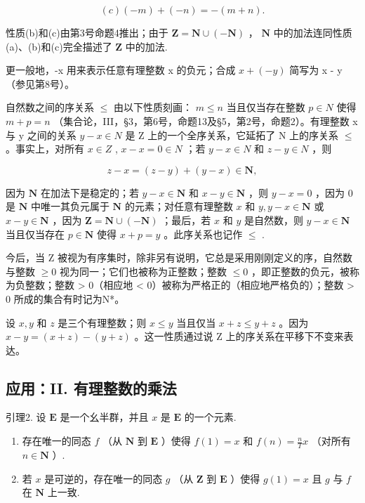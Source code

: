 \[
(c) (- m) + (- n) = - (m + n).
\]

性质(b)和(c)由第3号命题4推出；由于 \(\mathbf{Z} = \mathbf{N} \cup (-\mathbf{N})\) ， \(\mathbf{N}\) 中的加法连同性质(a)、(b)和(c)完全描述了 \(\mathbf{Z}\) 中的加法.

更一般地，-x 用来表示任意有理整数 x 的负元；合成 \(x + (-y)\) 简写为 x - y（参见第8号）。

自然数之间的序关系 \(\leqslant\) 由以下性质刻画： \(m \leqslant n\) 当且仅当存在整数 \(p \in N\) 使得 \(m + p = n\) （集合论，III，§3，第6号，命题13及§5，第2号，命题2）。有理整数 x 与 y 之间的关系 \(y - x \in N\) 是 Z 上的一个全序关系，它延拓了 N 上的序关系 \(\leqslant\) 。事实上，对所有 \(x \in Z\) , \(x - x = 0 \in N\) ；若 \(y - x \in N\) 和 \(z - y \in N\) ，则

\[
z - x = (z - y) + (y - x) \in \mathbf {N},
\]

因为 \(\mathbf{N}\) 在加法下是稳定的；若 \(y - x \in \mathbf{N}\) 和 \(x - y \in \mathbf{N}\) ，则 \(y - x = 0\) ，因为 \(0\) 是 \(\mathbf{N}\) 中唯一其负元属于 \(\mathbf{N}\) 的元素；对任意有理整数 \(x\) 和 \(y, y - x \in \mathbf{N}\) 或 \(x - y \in \mathbf{N}\) ，因为 \(\mathbf{Z} = \mathbf{N} \cup (-\mathbf{N})\) ；最后，若 \(x\) 和 \(y\) 是自然数，则 \(y - x \in \mathbf{N}\) 当且仅当存在 \(p \in \mathbf{N}\) 使得 \(x + p = y\) 。此序关系也记作 \(\leqslant\) .

今后，当 Z 被视为有序集时，除非另有说明，它总是采用刚刚定义的序，自然数与整数 \(\geqslant 0\) 视为同一；它们也被称为正整数；整数 \(\leqslant 0\) ，即正整数的负元，被称为负整数；整数 \textgreater{} 0（相应地 \textless{} 0）被称为严格正的（相应地严格负的）；整数 \textgreater{} 0 所成的集合有时记为N*。

设 \(x, y\) 和 \(z\) 是三个有理整数；则 \(x \leqslant y\) 当且仅当 \(x + z \leqslant y + z\) 。因为 \(x - y = (x + z) - (y + z)\) 。这一性质通过说 Z 上的序关系在平移下不变来表达。

\subsection{应用：II. 有理整数的乘法}

引理2. 设 \(\mathbf{E}\) 是一个幺半群，并且 \(x\) 是 \(\mathbf{E}\) 的一个元素.

\begin{enumerate}
\def\labelenumi{(\roman{enumi})}
\item
  存在唯一的同态 \(f\) （从 \(\mathbf{N}\) 到 \(\mathbf{E}\) ）使得 \(f(1) = x\) 和 \(f(n) = \frac{n}{T} x\) （对所有 \(n \in \mathbf{N}\) ）.
\item
  若 \(x\) 是可逆的，存在唯一的同态 \(g\) （从 \(\mathbf{Z}\) 到 \(\mathbf{E}\) ）使得 \(g(1) = x\) 且 \(g\) 与 \(f\) 在 \(\mathbf{N}\) 上一致.
\end{enumerate}

